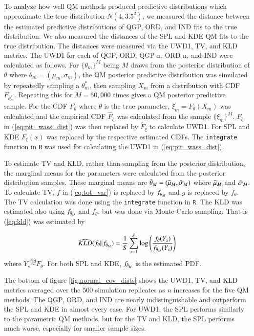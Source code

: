 \documentclass[preprint,12pt,authoryear]{elsarticle}
\newcommand{\1}[1]{\mathds{1}\left[#1\right]}
\begin{document}
To analyze how well QM methods produced predictive distributions which 
approximate the true distribution $N(4, 3.5^2)$, we measured the distance 
between the estimated predictive distributions of QGP, ORD, and IND fits to 
the true distribution. 
We also measured the distances of the SPL and KDE QM fits to the true 
distribution. The distances were measured via the UWD1, TV, and KLD metrics. 
The UWD1 for each of QGP, ORD, QGP-n, ORD-n, and IND were calculated as 
follows. For $\{\theta_m\}^M$ being $M$ draws from the posterior distribution
of $\theta$ where $\theta_m = (\mu_m, \sigma_m)$, the QM posterior predictive 
distribution was simulated by repeatedly sampling a $\theta_m^*$, then sampling 
$X_m$ from a distribution with CDF $F_{\theta_m^*}$. Repeating this for 
$M = 50,000$ times gives a QM posterior predictive sample. For the CDF 
$F_{\theta}$ where $\theta$ is the true parameter, $\xi_m = F_{\theta}(X_m)$ 
was calculated and the empirical CDF $\hat{F}_{\xi}$ was calculated from the 
sample $\{\xi_m\}^M$. $F_{\xi}$ in (\ref{eq:pit_wass_dist}) was then replaced 
by $\hat{F}_{\xi}$ to calculate UWD1. For SPL and KDE $F_{\xi}(x)$ was replaced 
by the respective estimated CDFs. The \texttt{integrate} function in \texttt{R} 
was used for calculating the UWD1 in (\ref{eq:pit_wass_dist}).

To estimate TV and KLD, rather than sampling from the posterior distribution, 
the marginal means for the parameters were calculated from the posterior 
distribution samples. These marginal means  are 
$\Bar{\theta}_M = (\Bar{\mu}_M, \Bar{\sigma}_M)$ where $\Bar{\mu}_M$ and 
$\Bar{\sigma}_M$. To calculate TV, 
$f$ in (\ref{eq:tot_var}) is replaced by $f_{\Bar{\theta}_M}$ and $g$ is 
replaced by $f_{\theta}$. The TV calculation was done using the 
\texttt{integrate} function in \texttt{R}. The KLD was estimated also using 
$f_{\Bar{\theta}_M}$ and $f_{\theta}$, but was done via Monte Carlo sampling. 
That is (\ref{eq:kld}) was estimated by

\[
    \widehat{KLD}(f_{\theta} || f_{\Bar{\theta}_M}) = 
    \frac{1}{S}\sum_{s = 1}^S \text{log} 
    \left(\frac{f_{\theta}(Y_s)}{f_{\Bar{\theta}_M}(Y_s)}\right)
\]
where $Y_s \overset{iid}{\sim} F_{\theta}$. For both SPL and KDE, 
$f_{\Bar{\theta}_M}$ is the estimated PDF.


The bottom of figure \ref{fig:normal_cov_dists} shows the UWD1, TV, and 
KLD metrics averaged over the 500 simulation replicates as $n$ increases for 
the five QM methods. The QGP, ORD, and IND are nearly indistinguishable and 
outperform the SPL and KDE in almost every case. 
For UWD1, the SPL performs similarly to the parametric QM methods, but for the 
TV and KLD, the SPL performs much worse, especially for smaller sample sizes. 
\end{document}
